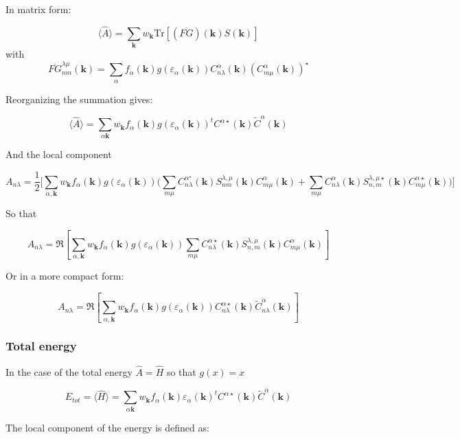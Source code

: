 \documentclass{article}
\newcommand{\op}[1]{\hat{#1}}
\begin{document}
\noindent
In matrix form:

\[\langle \op{A} \rangle = \sum_{\mathbf{k}} w_{\mathbf{k}}\mbox{Tr} 
 \left[(\overline{FG})(\mathbf{k}) S(\mathbf{k}) \right] \] 
\noindent
with
\[ \overline{FG}_{n m}^{\lambda \mu}(\mathbf{k})=  \sum_{\alpha} f_{\alpha}(\mathbf{k})
g(\varepsilon_{\alpha}(\mathbf{k}))C_{n \lambda}^{\alpha}(\mathbf{k})(C_{m \mu}^{\alpha}(\mathbf{k}))^{\star}    \]

\noindent
Reorganizing the summation gives:

\[\langle \op{A} \rangle=
\sum_{\alpha \mathbf{k}} w_{\mathbf{k}}
f_{\alpha}(\mathbf{k})g(\varepsilon_{\alpha}(\mathbf{k})) 
^tC^{\alpha \star}(\mathbf{k})\widetilde{C}^{\alpha}(\mathbf{k}) \]

\noindent
And the local component

\[ A_{n \lambda}=\frac{1}{2}\Bigg[\sum_{\alpha,\mathbf{k}} w_{\mathbf{k}}
f_{\alpha}(\mathbf{k})g(\varepsilon_{\alpha}(\mathbf{k})) 
\Bigg(\sum_{m \mu} C_{n \lambda}^{\alpha ^{\star}}(\mathbf{k})S_{nm}^{\lambda,\mu}(\mathbf{k})C_{m \mu}^{\alpha}(\mathbf{k}) + \sum_{m
\mu} C_{n \lambda}^{\alpha}(\mathbf{k})S_{n,m}^{\lambda,\mu
\star}(\mathbf{k})C_{m \mu}^{\alpha \star}(\mathbf{k})\Bigg) \Bigg]\]

\noindent
So that

\[ A_{n \lambda}=\Re \left[ 
\sum_{\alpha,\mathbf{k}} w_{\mathbf{k}} f_{\alpha}(\mathbf{k})g(\varepsilon_{\alpha}(\mathbf{k})) \sum_{m \mu} C_{n \lambda}^{\alpha \star}(\mathbf{k})
S_{n,m}^{\lambda,\mu}(\mathbf{k})C_{m \mu}^{\alpha}(\mathbf{k}) \right] \]

\noindent
Or in a more compact form:

\[ A_{n \lambda}=\Re \left[ 
\sum_{\alpha,\mathbf{k}} w_{\mathbf{k}} f_{\alpha}(\mathbf{k})g(\varepsilon_{\alpha}(\mathbf{k})) 
C_{n \lambda}^{\alpha \star}(\mathbf{k}) \widetilde{C}_{n \lambda}^{\alpha}(\mathbf{k}) \right]
 \]

\subsubsection{Total energy}

\noindent
In the case of the total energy $\op{A}=\op{H} $ so that $g(x)=x$

\[E_{tot}=\langle \op{H}\rangle=\sum_{\alpha \mathbf{k}} w_{\mathbf{k}}
f_{\alpha}(\mathbf{k})\varepsilon_{\alpha}(\mathbf{k})
^tC^{\alpha \star}(\mathbf{k})\widetilde{C}^{\alpha}(\mathbf{k}) \]

 \noindent
The local component of the energy is defined as:
\end{document}
